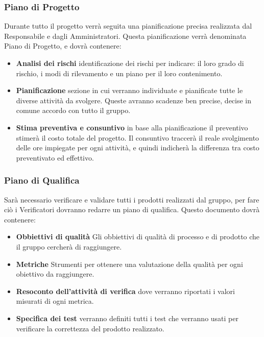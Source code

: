 \documentclass[11pt,a4paper]{article}
\begin{document}
{	\subsubsection{Piano di Progetto}
	Durante tutto il progetto verrà seguita una pianificazione precisa realizzata dal Responsabile e dagli Amministratori.
	Questa pianificazione verrà denominata Piano di Progetto, e dovrà contenere:
	\begin{itemize}
		\item \textbf{Analisi dei rischi} identificazione dei rischi per indicare: il loro grado di rischio, i modi di rilevamento e un piano per il loro contenimento.
		\item \textbf{Pianificazione} sezione in cui verranno individuate e pianificate tutte le diverse attività da svolgere. 
		Queste avranno scadenze ben precise, decise in comune accordo con tutto il gruppo.
		\item \textbf{Stima preventiva e consuntivo} in base alla pianificazione il preventivo stimerà il costo totale del progetto. Il consuntivo traccerà il reale svolgimento delle ore impiegate per ogni attività, e quindi indicherà la differenza tra costo preventivato ed effettivo. 
	\end{itemize}

\subsubsection{Piano di Qualifica}
Sarà necessario verificare e validare tutti i prodotti realizzati dal gruppo, per fare ciò i Verificatori dovranno redarre un piano di qualifica.
Questo documento dovrà contenere:
\begin{itemize}
	\item \textbf{Obbiettivi di qualità} Gli obbiettivi di qualità di processo e di prodotto che il gruppo cercherà di raggiungere.
	\item \textbf{Metriche} Strumenti per ottenere una valutazione della qualità per ogni obiettivo da raggiungere.
	\item \textbf{Resoconto dell'attività di verifica} dove verranno riportati i valori misurati di ogni metrica.
	\item \textbf{Specifica dei test} verranno definiti tutti i test che verranno usati per verificare la correttezza del prodotto realizzato.
\end{itemize}

}
\end{document}
